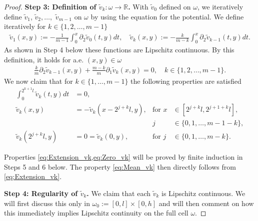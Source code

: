 \documentclass[a4paper, 10pt, twoside, notitlepage]{amsart}
\theoremstyle{plain}
\newcommand{\R}{\mathbb{R}}
\newcommand{\p}{\partial}
\begin{document}
\begin{proof}
                          \textbf{Step 3: Definition of $\tilde{v}_k:\omega \to \R$.}
                          With $\tilde{v}_0$ defined on $\omega$, we iteratively define $\tilde{v}_1$, $\tilde{v}_2,\dots,$ $\tilde{v}_{m-1}$ on $\omega$ by using the equation for the potential.
                          We define iteratively for $k\in\{1,2,\dots,m-1\}$
                          \begin{align*}
                            \tilde{v}_1(x,y) := -\frac{1}{m-1}\int_0^x \p_2 \tilde{v}_0(t,y) dt, \quad \tilde{v}_k(x,y) := - \frac{k}{m-k} \int_0^x \p_2 \tilde{v}_{k-1}(t,y) dt.
                          \end{align*}
                          As shown in Step 4 below these functions are Lipschitz continuous. 
                          By this definition, it holds for a.e. $(x,y) \in \omega$
                          \begin{align} \label{eq:DiffEqPotential}
                            \frac{k}{m} \p_2 \tilde{v}_{k-1}(x,y) + \frac{m-k}{m} \p_1 \tilde{v}_{k}(x,y) = 0, \quad k\in\{1,2,\dots,m-1\}.
                          \end{align}
                          We now claim that for $k \in \{1,\dots,m-1\}$ the following properties are satisfied
                          \begin{align}
                            \int_0^{2^{k+1}l}\tilde{v}_{k}(t,y) dt &=0, \label{eq:Mean_vk}\\
                            \tilde{v}_k(x,y) &= - \tilde{v}_k(x-2^{j+k}l,y),& \text{for } x &\in [2^{j+k}l,2^{j+1+k}l], \label{eq:Extension_vk}\\
                            &&j&\in \{0,1,\dots,m-1-k\}, \nonumber \\
                            \tilde{v}_k(2^{j+k}l,y) & = 0 = \tilde{v}_k(0,y), &\text{for } j &\in \{ 0,1,\dots,m-k\}. \label{eq:Zero_vk}
                          \end{align}
                        
Properties \cref{eq:Extension_vk,eq:Zero_vk} will be proved by finite induction in Steps 5 and 6 below.  The property \cref{eq:Mean_vk} then directly follows from \cref{eq:Extension_vk}.

                        \textbf{Step 4: Regularity of $\tilde{v}_k$.}
                        We claim that each $\tilde{v}_k$ is Lipschitz continuous. We will first discuss this only in $\omega_0:=[0,l]\times[0,h]$ and will then comment on how this immediately implies Lipschitz continuity on the full cell $\omega$.


\end{proof}
\end{document}
